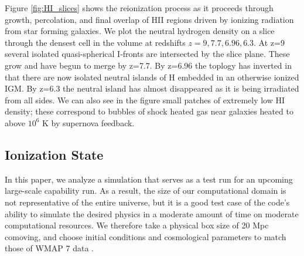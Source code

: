 \documentclass[letterpaper,10pt]{article}
\renewcommand{\(}{\left(}
\renewcommand{\)}{\right)}
\begin{document}
Figure \ref{fig:HI_slices} shows the reionization process as it proceeds through
growth, percolation, and final overlap of H{\footnotesize II} regions driven by ionizing
radiation from star forming galaxies. We plot the neutral hydrogen density
on a slice through the densest cell in the volume at redshifts $z=9, 7.7, 6.96, 6.3$. 
At z=9 several isolated quasi-spherical I-fronts are intersected by the slice plane.
These grow and have begun to merge by z=7.7. By z=6.96 the toplogy has inverted
in that there are now isolated neutral islands of H embedded in an otherwise ionized
IGM. By z=6.3 the neutral island has almost disappeared as it is being irradiated from 
all sides. We can also see in the figure small patches of extremely low H{\footnotesize I} density; these
correspond to bubbles of shock heated gas near galaxies heated to above $10^6$ K
by supernova feedback. 


\subsection{Ionization State}
\label{sec:ionization_state}


In this paper, we analyze a simulation that serves as a test run for
an upcoming large-scale capability run.  As a result, the size of our
computational domain is not representative of the entire universe, but it 
is a good test case of the code's ability to simulate the desired
physics in a moderate amount of time on moderate computational
resources.  We therefore take a physical box size of 20 Mpc comoving,
and choose initial conditions and cosmological parameters to match
those of WMAP 7 data \citep{JarosikEtal2011_WMAP7}.
\end{document}
